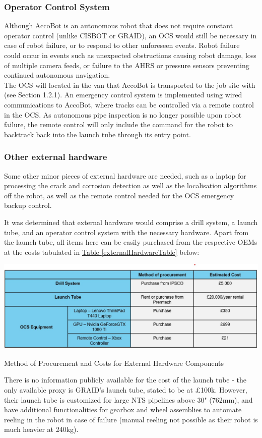 \documentclass[11pt]{article}		%
\newcommand{\tableref}[1]{\hyperref[#1]{Table \ref*{#1}}}     %
\begin{document}
		\subsubsection{Operator Control System}
    Although AccoBot is an autonomous robot that does not require constant operator control (unlike CISBOT or GRAID), an OCS would still be necessary in case of robot failure, or to respond to other unforeseen events.  Robot failure could occur in events such as unexpected obstructions causing robot damage, loss of multiple camera feeds, or failure to the AHRS or pressure sensors preventing continued autonomous navigation.
    \\ \hspace*{3ex} The OCS will located in the van that AccoBot is transported to the job site with (see Section 1.2.1). An emergency control system is implemented using wired communications to AccoBot, where tracks can be controlled via a remote control in the OCS. As autonomous pipe inspection is no longer possible upon robot failure, the remote control will only include the command for the robot to backtrack back into the launch tube through its entry point.  
    \subsubsection{Other external hardware}
    Some other minor pieces of external hardware are needed, such as a laptop for processing the crack and corrosion detection as well as the localisation algorithms off the robot, as well as the remote control needed for the OCS emergency backup control. 
    
    It was determined that external hardware would comprise a drill system, a launch tube, and an operator control system with the necessary hardware. Apart from the launch tube, all items here can be easily purchased from the respective OEMs at the costs tabulated in \tableref{externalHardwareTable} below:
    		
    			\begin{table}[H]
    	  		
    	  		\centering
    	  		\includegraphics[width=\textwidth]{External Hardware costs.jpg}
    				\caption{Method of Procurement and Costs for External Hardware Components}
    				\label{externalHardwareTable}
    			\end{table}
    		There is no information publicly available for the cost of the launch tube - the only available proxy is GRAID's launch tube, stated to be at £100k. However, their launch tube is customized for large NTS pipelines above 30" (762mm), and have additional functionalities for gearbox and wheel assemblies to automate reeling in the robot in case of failure (manual reeling not possible as their robot is much heavier at 240kg). 
    		
\end{document}

